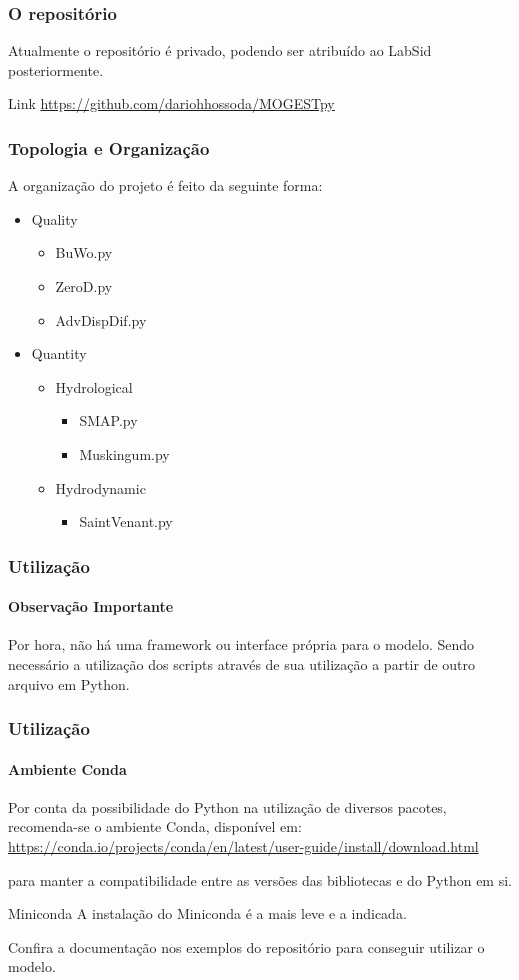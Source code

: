 \documentclass[aspectratio=169]{beamer}
\begin{document}
\begin{frame}
\frametitle{O repositório}
Atualmente o repositório é privado, podendo ser atribuído ao LabSid posteriormente.
\vfill
\begin{block}{Link}
\url{https://github.com/dariohhossoda/MOGESTpy}
\end{block}
\end{frame}

\begin{frame}
\frametitle{Topologia e Organização}
A organização do projeto é feito da seguinte forma:
\vfill
	\begin{itemize}
		\item Quality
		\begin{itemize}
			\item BuWo.py
			\item ZeroD.py
			\item AdvDispDif.py
		\end{itemize}
		\item Quantity
		\begin{itemize}
			\item Hydrological
			\begin{itemize}
				\item SMAP.py
				\item Muskingum.py
			\end{itemize}
			\item Hydrodynamic
			\begin{itemize}
				\item SaintVenant.py
			\end{itemize}
		\end{itemize}
	\end{itemize}
\end{frame}

\begin{frame}
\frametitle{Utilização}
\framesubtitle{Observação Importante}
Por hora, não há uma framework ou interface própria para o modelo. Sendo necessário a utilização dos scripts através de sua utilização a partir de outro arquivo em Python.
\end{frame}

\begin{frame}
\frametitle{Utilização}
\framesubtitle{Ambiente Conda}
Por conta da possibilidade do Python na utilização de diversos pacotes, recomenda-se o ambiente Conda, disponível em: \url{https://conda.io/projects/conda/en/latest/user-guide/install/download.html}

para manter a compatibilidade entre as versões das bibliotecas e do Python em si.

\begin{alertblock}{Miniconda}
A instalação do Miniconda é a mais leve e a indicada.
\end{alertblock}
Confira a documentação nos exemplos do repositório para conseguir utilizar o modelo.
\end{frame}
\end{document}
